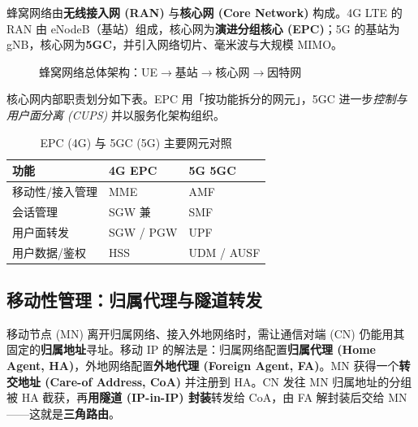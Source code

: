 蜂窝网络由\textbf{无线接入网 (RAN)} 与\textbf{核心网 (Core Network)} 构成。4G LTE 的 RAN 由 eNodeB（基站）组成，核心网为\textbf{演进分组核心 (EPC)}；5G 的基站为 gNB，核心网为\textbf{5GC}，并引入网络切片、毫米波与大规模 MIMO。

\begin{figure}[H]
\centering
{}
\caption{蜂窝网络总体架构：UE$\to$基站$\to$核心网$\to$因特网}
\label{fig:cellular_arch}
\end{figure}

核心网内部职责划分如下表。EPC 用「按功能拆分的网元」，5GC 进一步\emph{控制与用户面分离 (CUPS)} 并以服务化架构组织。

\begin{table}[H]
\centering
\caption{EPC (4G) 与 5GC (5G) 主要网元对照}
\renewcommand{\arraystretch}{1.35}
\begin{tabulary}{\textwidth}{@{}lLL@{}}
\toprule
\textbf{功能} & \textbf{4G EPC} & \textbf{5G 5GC} \\
\midrule
移动性/接入管理 & MME & AMF \\
会话管理 & SGW 兼 & SMF \\
用户面转发 & SGW / PGW & UPF \\
用户数据/鉴权 & HSS & UDM / AUSF \\
\bottomrule
\end{tabulary}
\end{table}

\subsection{移动性管理：归属代理与隧道转发}

移动节点 (MN) 离开归属网络、接入外地网络时，需让通信对端 (CN) 仍能用其固定的\textbf{归属地址}寻址。移动 IP 的解法是：归属网络配置\textbf{归属代理 (Home Agent, HA)}，外地网络配置\textbf{外地代理 (Foreign Agent, FA)}。MN 获得一个\textbf{转交地址 (Care-of Address, CoA)} 并注册到 HA。CN 发往 MN 归属地址的分组被 HA 截获，再\textbf{用隧道 (IP-in-IP) 封装}转发给 CoA，由 FA 解封装后交给 MN——这就是\textbf{三角路由}。

